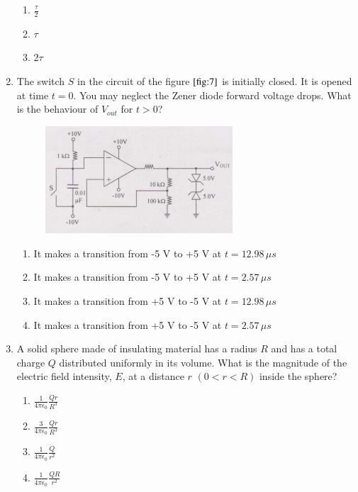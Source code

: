 \documentclass[journal]{IEEEtran}
\numberwithin{equation}{enumi}
\numberwithin{figure}{enumi}
\begin{document}
\begin{enumerate}
\begin{multicols}{4}
\begin{enumerate}
        \item $\frac{\tau}{2}$
        \item $\tau$
        \item $2\tau$
    \end{enumerate}
    \end{multicols}
    \bigskip
    \item The switch $S$ in the circuit of the figure $\ref{fig:7}$ is initially closed. It is opened at time $t = 0$. You may neglect the Zener diode forward voltage drops. What is the behaviour of $V_{out}$ for $t > 0$?
    \begin{figure}[!ht]
    \centering
    \includegraphics[width=7cm]{figs/7.png}
    \caption{}
    \label{fig:7}
    \end{figure}
    \begin{enumerate}
        \item It makes a transition from -5 V to +5 V at $t = 12.98 \, \mu s$
        \item It makes a transition from -5 V to +5 V at $t = 2.57 \, \mu s$
        \item It makes a transition from +5 V to -5 V at $t = 12.98 \, \mu s$
        \item It makes a transition from +5 V to -5 V at $t = 2.57 \, \mu s$
    \end{enumerate}
    \bigskip
    \item A solid sphere made of insulating material has a radius $R$ and has a total charge $Q$ distributed uniformly in its volume. What is the magnitude of the electric field intensity, $E$, at a distance $r$ $(0 < r < R)$ inside the sphere?
    \begin{multicols}{4}
    \begin{enumerate}
        \item $\frac{1}{4 \pi \epsilon_0} \frac{Qr}{R^3}$
        \item $\frac{3}{4 \pi \epsilon_0} \frac{Qr}{R^3}$
        \item $\frac{1}{4 \pi \epsilon_0} \frac{Q}{r^2}$
        \item $\frac{1}{4 \pi \epsilon_0} \frac{QR}{r^2}$

\end{enumerate}
\end{multicols}
\end{enumerate}
\end{document}
